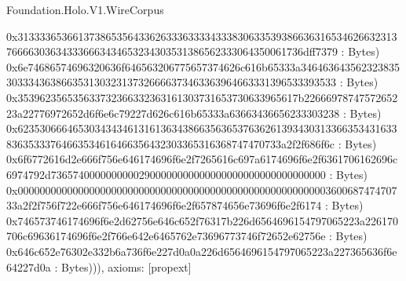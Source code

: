 \begin{lexlean}{Foundation.Holo.V1.WireCorpus}
\begin{semanticmodule}
{0x313333653661373865356433626333633334333830633539386636316534626632313766663036343336663434653234303531386562333064350061736dff7379 : Bytes) 0x6e74686574696320636f646563206775657374626c616b65333a346463643562323835303334363866353130323137326666373463363964663331396533393533 : Bytes) 0x353962356535633732366332363161303731653730633965617b2266697874757265223a22776972652d6f6e6c79227d626c616b65333a63663436656233303238 : Bytes) 0x62353066646530343434613161363438663563653763626139343031336635343163383635333764663534616466356432303365316368747470733a2f2f686f6c : Bytes) 0x6f6772616d2e666f756e646174696f6e2f7265616c697a6174696f6e2f6361706162696c6974792d73657400000000002900000000000000000000000000000000 : Bytes) 0x00000000000000000000000000000000000000000000000000000000360068747470733a2f2f756f722e666f756e646174696f6e2f657874656e73696f6e2f6174 : Bytes) 0x746573746174696f6e2d62756e646c652f76317b226d6564696154797065223a226170706c69636174696f6e2f766e642e6465762e73696773746f72652e62756e : Bytes) 0x646c652e76302e332b6a736f6e227d0a0a226d6564696154797065223a227365636f6e64227d0a : Bytes))),
  axioms: [propext]
}


\end{semanticmodule}
\end{lexlean}
